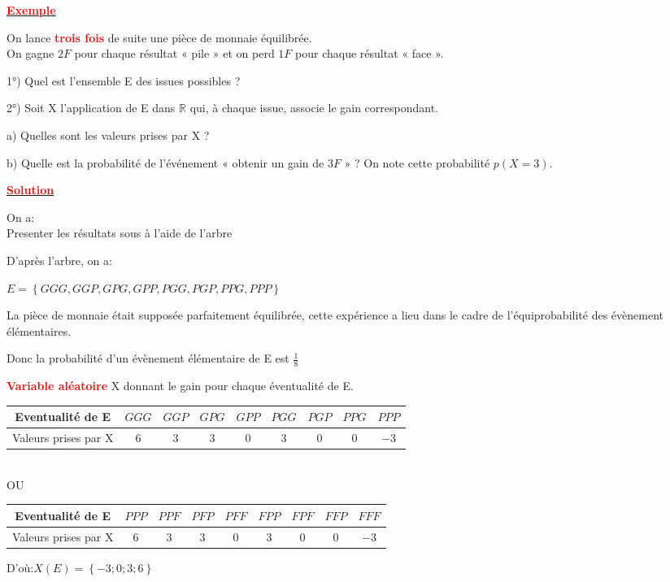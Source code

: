 \documentclass[12pt]{article}
\begin{document}
\underline{\textbf{\textcolor{red}{Exemple}}}

On lance \textbf{\textcolor{red}{trois fois}} de suite une pièce de monnaie équilibrée.\\ On gagne $2{F}$ pour chaque résultat « pile » et on perd $1{F}$ pour chaque résultat « face ».

1°) Quel est l’ensemble E des issues possibles ?

2°) Soit X l’application de E dans $\mathbb{R}$ qui, à chaque issue, associe le gain correspondant.

	a) Quelles sont les valeurs prises par X ?

	b) Quelle est la probabilité de l’événement « obtenir un gain de ${3F}$ » ? On note cette probabilité $p(X = 3)$.
	
\underline{\textbf{\textcolor{red}{Solution}}}

On a:\\
Presenter les résultats sous à l'aide de l'arbre

D'après l'arbre, on a:

$E=\left\lbrace GGG, GGP, GPG, GPP, PGG, PGP, PPG, PPP \right\rbrace $

La pièce de monnaie était supposée parfaitement équilibrée, cette expérience a lieu dans le cadre de l'équiprobabilité des évènement élémentaires. 

Donc la probabilité d'un évènement élémentaire de E est $\frac{1}{8}$

\textbf{\textcolor{red}{Variable aléatoire}} X donnant le gain pour chaque éventualité de E.

\begin{tabular}{|c|c|c|c|c|c|c|c|c|}
\hline
Eventualité de E & $GGG$ & $GGP$ & $GPG$&$GPP$&$PGG$&$PGP$&$PPG$&$PPP$\\
\hline
Valeurs prises par X &$6$ &$3$&$3$&$0$&$3$&$0$&$0$&$-3$ \\
\hline
\end{tabular}\\
OU\\
\begin{tabular}{|c|c|c|c|c|c|c|c|c|}
\hline
Eventualité de E & $PPP$ & $PPF$ & $PFP$&$PFF$&$FPP$&$FPF$&$FFP$&$FFF$\\
\hline
Valeurs prises par X &$6$ &$3$&$3$&$0$&$3$&$0$&$0$&$-3$ \\
\hline
\end{tabular}

D'où:$X(E) = \left\lbrace -3 ;0 ;3 ;6 \right\rbrace $\\
\end{document}
